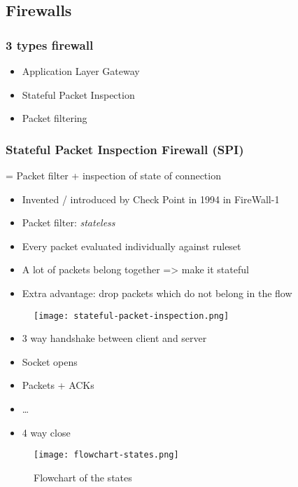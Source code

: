 \documentclass{article}
\begin{document}
\subsection{Firewalls}

\subsubsection{3 types firewall}

\begin{itemize}
    \item Application Layer Gateway
    \item Stateful Packet Inspection
    \item Packet filtering
\end{itemize}

\subsubsection{Stateful Packet Inspection Firewall (SPI)}

= Packet filter + inspection of state of connection

\begin{itemize}
    \item Invented / introduced by Check Point in 1994 in FireWall-1
    \item Packet filter: \textit{stateless}
    \item Every packet evaluated individually against ruleset
    \item A lot of packets belong together => make it stateful
    \item Extra advantage: drop packets which do not belong in the flow
\end{itemize}

\begin{figure}[H]
    \centering
    \texttt{[image: stateful-packet-inspection.png]}
    \caption{}
\end{figure}

\begin{itemize}
    \item 3 way handshake between client and server
    \item Socket opens
    \item Packets + ACKs
    \item \dots
    \item 4 way close
\end{itemize}

\begin{figure}[H]
    \centering
    \texttt{[image: flowchart-states.png]}
    \caption{Flowchart of the states}
\end{figure}
\end{document}
